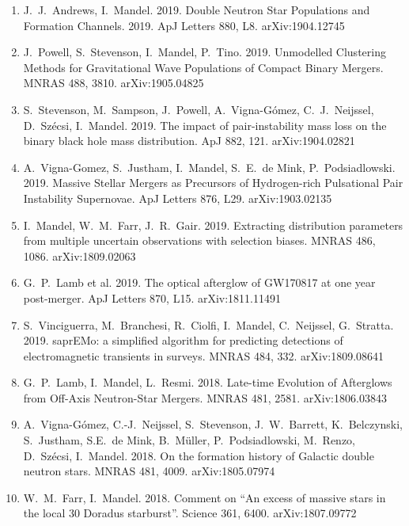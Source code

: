 \documentclass[margin,line]{res}
\begin{document}
\begin{resume}
\begin{enumerate}
\item J.~J.~Andrews, I.~Mandel. 2019. Double Neutron Star Populations and Formation Channels.   2019.  ApJ Letters 880, L8.  arXiv:1904.12745

\item J.~Powell, S.~Stevenson, I.~Mandel, P.~Tino.  2019.  Unmodelled Clustering Methods for Gravitational Wave Populations of Compact Binary Mergers.  MNRAS 488, 3810. arXiv:1905.04825

\item S.~Stevenson, M.~Sampson, J.~Powell, A.~Vigna-G\'{o}mez, C.~J.~Neijssel, D.~Sz\'{e}csi, I.~Mandel.  2019. The impact of pair-instability mass loss on the binary black hole mass distribution.   ApJ 882, 121.  arXiv:1904.02821 

\item A.~Vigna-Gomez, S.~Justham, I.~Mandel, S.~E.~de Mink, P.~Podsiadlowski.  2019.  Massive Stellar Mergers as Precursors of Hydrogen-rich Pulsational Pair Instability Supernovae.  ApJ Letters 876, L29. arXiv:1903.02135

\item I.~Mandel, W.~M.~Farr, J.~R.~Gair.  2019. Extracting distribution parameters from multiple uncertain observations with selection biases.  MNRAS 486, 1086.  arXiv:1809.02063

\item G.~P.~Lamb et al. 2019. The optical afterglow of GW170817 at one year post-merger.  ApJ Letters 870, L15. arXiv:1811.11491

\item S.~Vinciguerra, M.~Branchesi, R.~Ciolfi, I.~Mandel, C.~Neijssel, G.~Stratta.  2019. saprEMo: a simplified algorithm for predicting detections of electromagnetic transients in surveys.  MNRAS 484, 332.  arXiv:1809.08641

\item G.~P.~Lamb, I.~Mandel, L.~Resmi.  2018.  Late-time Evolution of Afterglows from Off-Axis Neutron-Star Mergers.  MNRAS 481, 2581.  arXiv:1806.03843

\item A.~Vigna-G\'{o}mez, C.-J.~Neijssel, S.~Stevenson, J.~W.~Barrett, K.~Belczynski, S.~Justham, S.E.~de Mink, B.~M{\"u}ller, P.~Podsiadlowski, M.~Renzo, D.~Sz{\'e}csi, I.~Mandel.  2018. On the formation history of Galactic double neutron stars.  MNRAS 481, 4009. arXiv:1805.07974

\item W.~M.~Farr, I.~Mandel.  2018.  Comment on ``An excess of massive stars in the local 30 Doradus starburst''.  Science 361, 6400.  arXiv:1807.09772


\end{enumerate}
\end{resume}
\end{document}
